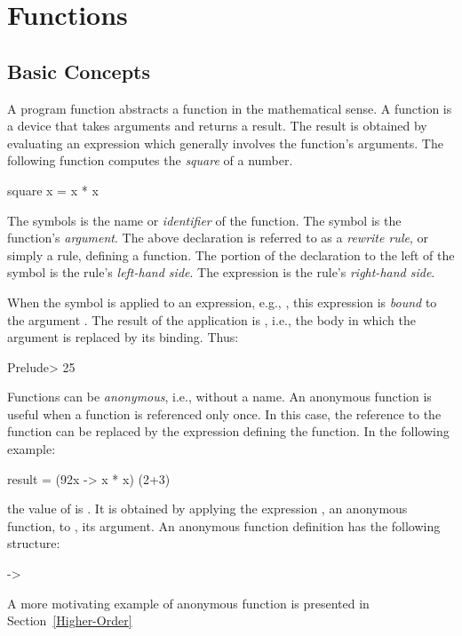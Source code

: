 \section{Functions}

\subsection{Basic Concepts}
\label{Basic concepts}

A program function abstracts a function in the mathematical sense.
A function is a device that takes arguments and returns a result.
The result is obtained by evaluating an expression
which generally involves the function's arguments.
The following function computes the \emph{square} of a number.
%
\begin{prog}
square x = x * x
\end{prog}
%
The symbols  is the name or
\emph{identifier} of the function.
The symbol  is the function's 
\emph{argument}.
The above declaration is referred to as a
\emph{rewrite rule}, or simply a rule,
defining a function.
The portion of the declaration to the left of the symbol \ccode{=}
is the rule's \emph{left-hand side}.
The expression  is the rule's
\emph{right-hand side}.

When the  symbol is applied to an expression,
e.g., , this expression is
\emph{bound}
to the argument .
The result of the application is
, i.e., the body
in which the argument is replaced by its binding.
Thus:
%
\begin{prog}
Prelude> 
25
\end{prog}
%
Functions can be \emph{anonymous},
i.e., without a name.
An anonymous function is useful when a function is referenced
only once.  In this case, the reference to the function
can be replaced by the expression defining the function.
In the following example:
%
\begin{prog}
result = (\char92x -> x * x) (2+3)
\end{prog}
%
the value of  is .
It is obtained by applying the expression
, an anonymous function,
to , its argument.
An anonymous function definition has the following structure:
%
\begin{prog}
 -> 
\end{prog}
%
A more motivating example of anonymous function
is presented in Section~\ref{Higher-Order}

